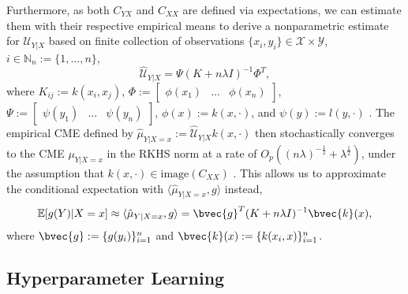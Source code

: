 \documentclass[runningheads, envcountsame, a4paper]{llncs}
\begin{document}
			Furthermore, as both $C_{YX}$ and $C_{XX}$ are defined via expectations, we can estimate them with their respective empirical means to derive a nonparametric estimate for $\mathcal{U}_{Y | X}$ based on finite collection of observations $\{x_{i}, y_{i}\} \in \mathcal{X} \times \mathcal{Y}$, $i \in \mathbb{N}_{n} := \{1, \dots, n\}$,
			\begin{equation}
				\hat{\mathcal{U}}_{Y | X} = \Psi (K + n \lambda I)^{-1} \Phi^{T},
			\label{eq:empirical_conditional_embedding}
			\end{equation}
			where $K_{ij} := k(x_{i}, x_{j})$, $\Phi := \begin{bmatrix} \phi(x_{1}) & \dots & \phi(x_{n}) \end{bmatrix}$, $\Psi := \begin{bmatrix} \psi(y_{1}) & \dots & \psi(y_{n}) \end{bmatrix}$, $\phi(x) := k(x, \cdot)$, and $\psi(y) := l(y, \cdot)$ \citep{song2013kernel}. The empirical \gls{CME} defined by $\hat{\mu}_{Y | X = x} := \hat{\mathcal{U}}_{Y | X} k(x, \cdot)$ then stochastically converges to the \gls{CME} $\mu_{Y | X = x}$ in the RKHS norm at a rate of $O_{p}((n \lambda)^{-\frac{1}{2}} + \lambda^{\frac{1}{2}})$, under the assumption that $k(x, \cdot) \in \mathrm{image}(C_{XX})$ \cite[Theorem 6]{song2009hilbert}. This allows us to approximate the conditional expectation with $\langle \hat{\mu}_{Y | X = x}, g \rangle$ instead, 
			\begin{equation}
				\mathbb{E}[g(Y) | X = x] \approx \langle \hat{\mu}_{Y | X = x}, g \rangle = \bvec{g}^{T} (K + n \lambda I)^{-1} \bvec{k}(x),
			\label{eq:empirical_conditional_expectation}
			\end{equation}
			where $\bvec{g} := \{g(y_{i})\}_{i = 1}^{n}$ and $\bvec{k}(x) := \{k(x_{i}, x)\}_{i = 1}^{n}$.
	
		\subsection{Hyperparameter Learning}
	
\end{document}
